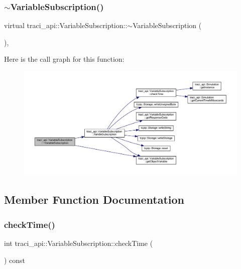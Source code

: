 \subsubsection{\texorpdfstring{$\sim$\+Variable\+Subscription()}{~VariableSubscription()}}
{\footnotesize\ttfamily virtual traci\+\_\+api\+::\+Variable\+Subscription\+::$\sim$\+Variable\+Subscription (\begin{DoxyParamCaption}{ }\end{DoxyParamCaption})\hspace{0.3cm}{\ttfamily [inline]}, {\ttfamily [virtual]}}

Here is the call graph for this function\+:\nopagebreak
\begin{figure}[H]
\begin{center}
\leavevmode
\includegraphics[width=350pt]{classtraci__api_1_1_variable_subscription_afc66a609515b051a28df4df35cbcbe61_cgraph}
\end{center}
\end{figure}


\subsection{Member Function Documentation}
\mbox{\label{classtraci__api_1_1_variable_subscription_a6e17a9560c53c7c9543599f93caeeaf8}} 
\subsubsection{\texorpdfstring{check\+Time()}{checkTime()}}
{\footnotesize\ttfamily int traci\+\_\+api\+::\+Variable\+Subscription\+::check\+Time (\begin{DoxyParamCaption}{ }\end{DoxyParamCaption}) const}

